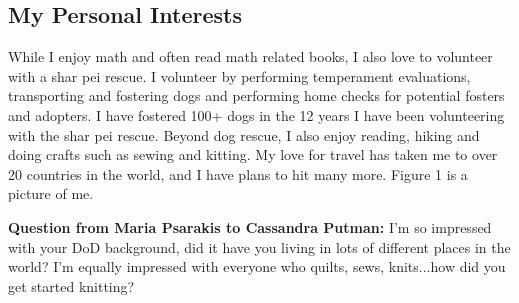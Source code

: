 \subsection{My Personal Interests}
While I enjoy math and often read math related books, I also love to volunteer with a shar pei rescue.  I volunteer by performing temperament evaluations, transporting and fostering dogs and  performing home checks for potential fosters and adopters.  I have fostered 100+ dogs in the 12 years I have been volunteering with the shar pei rescue.  Beyond dog rescue, I also enjoy reading, hiking and doing crafts such as sewing and kitting. My love for travel has taken me to over 20 countries in the world, and I have plans to hit many more.  Figure 1 is a picture of me.

\textbf{Question from Maria Psarakis to Cassandra Putman:} I'm so impressed with your DoD background, did it have you living in lots of different places in the world? I'm equally impressed with everyone who quilts, sews, knits...how did you get started knitting? 

